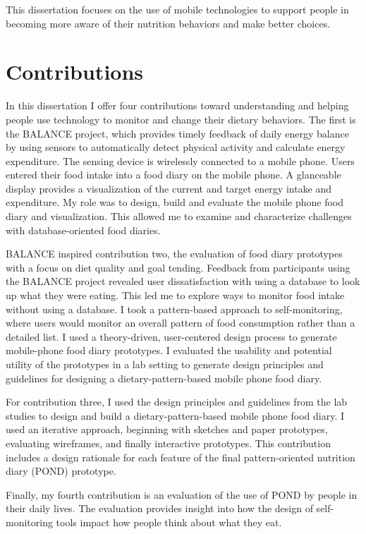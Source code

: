 This dissertation focuses on the use of mobile technologies to support people in becoming more aware of their nutrition behaviors and make better choices. 

\section{Contributions}
In this dissertation I offer four contributions toward understanding and helping people use technology to monitor and change their dietary behaviors. The first is the BALANCE project, which provides timely feedback of daily energy balance by using sensors to automatically detect physical activity and calculate energy expenditure. The sensing device is wirelessly connected to a mobile phone. Users entered their food intake into a food diary on the mobile phone. A glanceable display provides a visualization of the current and target energy intake and expenditure. My role was to design, build and evaluate the mobile phone food diary and visualization. This allowed me to examine and characterize challenges with database-oriented food diaries.  

BALANCE inspired contribution two, the evaluation of food diary prototypes with a focus on diet quality and goal tending. Feedback from participants using the BALANCE project revealed user dissatisfaction with using a database to look up what they were eating. This led me to explore ways to monitor food intake without using a database. I took a pattern-based approach to self-monitoring, where users would monitor an overall pattern of food consumption rather than a detailed list. I used a theory-driven, user-centered design process to generate mobile-phone food diary prototypes. I evaluated the usability and potential utility of the prototypes in a lab setting to generate design principles and guidelines for designing a dietary-pattern-based mobile phone food diary. 

For contribution three, I used the design principles and guidelines from the lab studies to design and build a dietary-pattern-based mobile phone food diary. I used an iterative approach, beginning with sketches and paper prototypes, evaluating wireframes, and finally interactive prototypes. This contribution includes a design rationale for each feature of the final pattern-oriented nutrition diary (POND) prototype. 

Finally, my fourth contribution is an evaluation of the use of POND by people in their daily lives. The evaluation provides insight into how the design of self-monitoring tools impact how people think about what they eat. 

